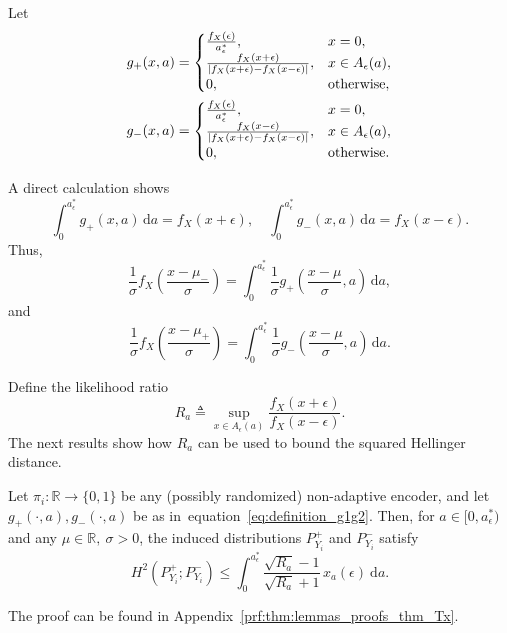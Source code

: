 \documentclass[10pt]{article} %
\def\eqref#1{equation~\ref{#1}}
\theoremstyle{plain}
\theoremstyle{definition}
\theoremstyle{remark}
\newcommand{\dx}{\mathrm{d}}
\begin{document}
Let
\begin{align}
g_+(x, a) &= \begin{cases} 
\frac{f_X(\epsilon)}{a_{\epsilon}^*}, & x = 0, \\
\frac{f_X(x + \epsilon)}{|f_X(x + \epsilon) - f_X(x - \epsilon)|}, & x \in  A_{\epsilon}(a), \\
0, & \text{otherwise},
\end{cases}  \notag \\
g_-(x, a) &= \begin{cases} 
\frac{f_X(\epsilon)}{a_{\epsilon}^*}, & x = 0, \\
\frac{f_X(x - \epsilon)}{|f_X(x + \epsilon) - f_X(x - \epsilon)|}, & x \in A_{\epsilon}(a), \\
0, & \text{otherwise}.
\end{cases}
\label{eq:definition_g1g2}
\end{align}

A direct calculation shows
\[
\int_0^{a_{\epsilon}^*} g_+(x, a) \,\dx a = f_X(x+\epsilon), 
\quad
\int_0^{a_{\epsilon}^*} g_-(x, a) \,\dx a = f_X(x-\epsilon).
\]
Thus, 
\[
\frac{1}{\sigma} f_X \left( \frac{x - \mu_-}{\sigma} \right) 
= \int_0^{a_{\epsilon}^*} \frac{1}{\sigma} g_+ \left( \frac{x - \mu}{\sigma}, a \right) \,\dx a,
\]
and
\[
\frac{1}{\sigma} f_X \left( \frac{x - \mu_+}{\sigma} \right) 
= \int_0^{a_{\epsilon}^*} \frac{1}{\sigma} g_- \left( \frac{x - \mu}{\sigma}, a \right) \,\dx a.
\]

Define the likelihood ratio
\begin{equation}
R_a \triangleq \sup_{x \in A_{\epsilon}(a)} \frac{f_X(x + \epsilon)}{f_X(x - \epsilon)}.
\label{eq:definition_Ma}
\end{equation}
The next results show how \(R_a\) can be used to bound the squared Hellinger distance.

\begin{lemma}
\label{lem:hellinger_bound_general}
Let $\pi_i:\mathbb{R}\to\{0,1\}$ be any (possibly randomized) non-adaptive encoder, and let $g_+(\cdot,a),g_-(\cdot,a)$ be as in~\eqref{eq:definition_g1g2}.  
Then, for $a \in [0,a_{\epsilon}^{*})$ and any $\mu\in\mathbb{R},\ \sigma>0$, the induced distributions $P_{Y_i}^+$ and $P_{Y_i}^-$ satisfy
\begin{equation}
H^2(P_{Y_i}^+; P_{Y_i}^-) 
\leq \int_0^{a_{\epsilon}^{*}} \frac{\sqrt{R_a} - 1}{\sqrt{R_a} + 1} \, x_a(\epsilon) \ \dx a. \label{eq:H_temp_bound}
\end{equation}
\end{lemma}
The proof can be found in Appendix~\ref{prf:thm:lemmas_proofs_thm_Tx}. 
\end{document}
